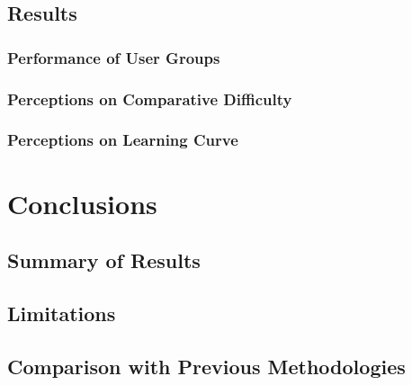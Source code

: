 
\subsection{Results}

\subsubsection{Performance of User Groups}

\subsubsection{Perceptions on Comparative Difficulty}

\subsubsection{Perceptions on Learning Curve}


\section{Conclusions}

\subsection{Summary of Results}

\subsection{Limitations}

\subsection{Comparison with Previous Methodologies}

